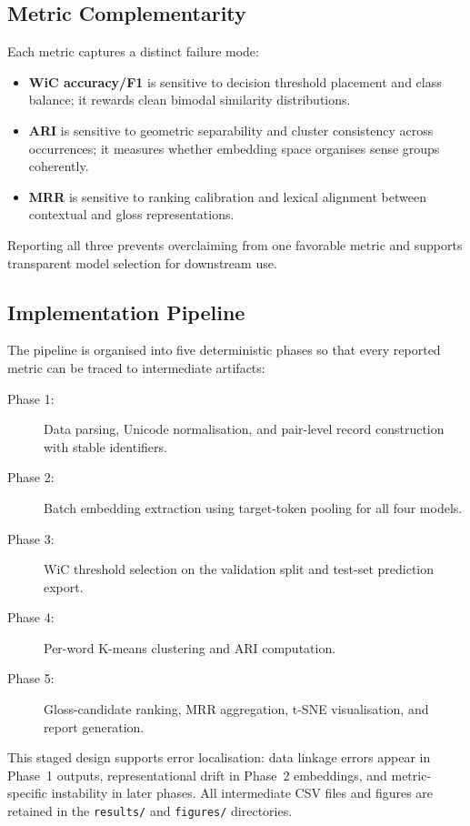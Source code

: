 \documentclass{ieeeaccess}
\begin{document}
\subsection{Metric Complementarity}

Each metric captures a distinct failure mode:
\begin{itemize}
  \item \textbf{WiC accuracy/F1} is sensitive to decision threshold placement
        and class balance; it rewards clean bimodal similarity distributions.
  \item \textbf{ARI} is sensitive to geometric separability and cluster
        consistency across occurrences; it measures whether embedding space
        organises sense groups coherently.
  \item \textbf{MRR} is sensitive to ranking calibration and lexical alignment
        between contextual and gloss representations.
\end{itemize}
Reporting all three prevents overclaiming from one favorable metric and
supports transparent model selection for downstream use.

\subsection{Implementation Pipeline}

The pipeline is organised into five deterministic phases so that every
reported metric can be traced to intermediate artifacts:
\begin{description}
  \item[Phase 1:] Data parsing, Unicode normalisation, and pair-level record
    construction with stable identifiers.
  \item[Phase 2:] Batch embedding extraction using target-token pooling for
    all four models.
  \item[Phase 3:] WiC threshold selection on the validation split and
    test-set prediction export.
  \item[Phase 4:] Per-word K-means clustering and ARI computation.
  \item[Phase 5:] Gloss-candidate ranking, MRR aggregation, t-SNE
    visualisation, and report generation.
\end{description}

This staged design supports error localisation: data linkage errors appear
in Phase~1 outputs, representational drift in Phase~2 embeddings, and
metric-specific instability in later phases.
All intermediate CSV files and figures are retained in the \texttt{results/}
and \texttt{figures/} directories.
\end{document}
